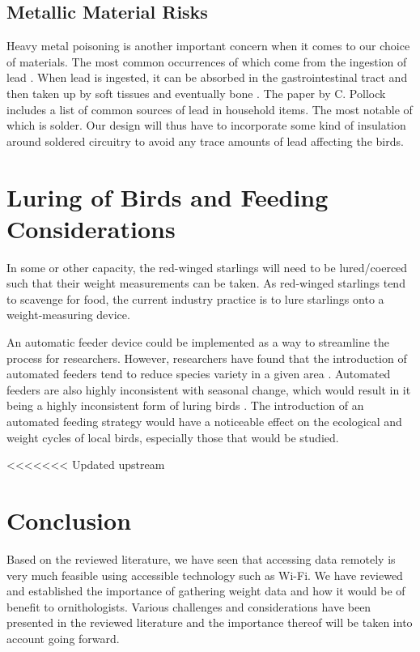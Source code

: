 \documentclass[class=report,11pt,crop=false]{standalone}
\begin{document}
\subsection{Metallic Material Risks}
Heavy metal poisoning is another important concern when it comes to our choice of materials. The most common occurrences of which come from the ingestion of lead \cite{PollockHeavyMetal}. When lead is ingested, it can be absorbed in the gastrointestinal tract and then taken up by soft tissues and eventually bone \cite{PollockHeavyMetal}. The paper by C. Pollock includes a list of common sources of lead in household items. The most notable of which is solder. Our design will thus have to incorporate some kind of insulation around soldered circuitry to avoid any trace amounts of lead affecting the birds.

\pagebreak
\section{Luring of Birds and Feeding Considerations}

In some or other capacity, the red-winged starlings will need to be lured/coerced such that their weight measurements can be taken. As red-winged starlings tend to scavenge for food, the current industry practice is to lure starlings onto a weight-measuring device. 

An automatic feeder device could be implemented as a way to streamline the process for researchers. However, researchers have found that the introduction of automated feeders tend to reduce species variety in a given area \cite{GalbraithFeeders}. Automated feeders are also highly inconsistent with seasonal change, which would result in it being a highly inconsistent form of luring birds \cite{GalbraithFeeders}. The introduction of an automated feeding strategy would have a noticeable effect on the ecological and weight cycles of local birds, especially those that would be studied.

<<<<<<< Updated upstream
\section{Conclusion}

Based on the reviewed literature, we have seen that accessing data remotely is very much feasible using accessible technology such as Wi-Fi. We have reviewed and established the importance of gathering weight data and how it would be of benefit to ornithologists. Various challenges and considerations have been presented in the reviewed literature and the importance thereof will be taken into account going forward. 
\end{document}
